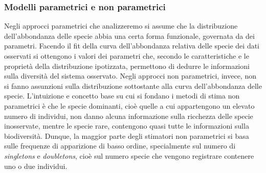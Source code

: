 \subsubsection{Modelli parametrici e non parametrici}
Negli approcci parametrici che analizzeremo si assume che la distribuzione dell'abbondanza delle specie abbia una certa forma funzionale, governata da dei parametri. Facendo il fit della curva dell'abbondanza relativa delle specie dei dati osservati si ottengono i valori dei parametri che, secondo le caratteristiche e le proprietà della distribuzione ipotizzata, permettono di dedurre le informazioni sulla diversità del sistema osservato.\newline
Negli approcci non parametrici, invece, non si fanno assunzioni sulla distribuzione sottostante alla curva dell'abbondanza delle specie. L'intuizione e concetto base su cui si fondano i metodi di stima non parametrici è che le specie dominanti, cioè quelle a cui appartengono un elevato numero di individui, non danno alcuna informazione sulla ricchezza delle specie inosservate, mentre le specie rare, contengono quasi tutte le informazioni sulla biodiversità. Dunque, la maggior parte degli stimatori non parametrici si basa sulle frequenze di apparizione di basso ordine, specialmente sul numero di \emph{singletons} e \emph{doubletons}, cioè sul numero specie che vengono registrare contenere uno o due individui.

